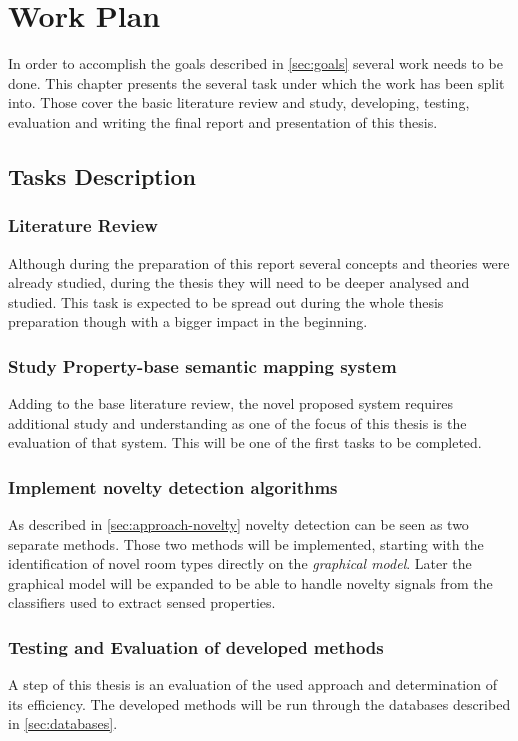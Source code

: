 \chapter{Work Plan}
\label{chap:workplan}
In order to accomplish the goals described in \autoref{sec:goals} several work needs to be done.
This chapter presents the several task under which the work has been split into.
Those cover the basic literature review and study, developing, testing, evaluation and writing the final report and presentation of this thesis.

\section{Tasks Description}
\subsection{Literature Review}
Although during the preparation of this report several concepts and theories were already studied, during the thesis they will need to be deeper analysed and studied.
This task is expected to be spread out during the whole thesis preparation though with a bigger impact in the beginning.

\subsection{Study Property-base semantic mapping system}
Adding to the base literature review, the novel proposed system \cite{pronobis2011exploiting} requires additional study and understanding as one of the focus of this thesis is the evaluation of that system. This will be one of the first tasks to be completed.

\subsection{Implement novelty detection algorithms}
As described in \autoref{sec:approach-novelty} novelty detection can be seen as two separate methods.
Those two methods will be implemented, starting with the identification of novel room types directly on the \emph{graphical model}.
Later the graphical model will be expanded to be able to handle novelty signals from the classifiers used to extract sensed properties.

\subsection{Testing and Evaluation of developed methods}
A step of this thesis is an evaluation of the used approach and determination of its efficiency.
The developed methods will be run through the databases described in \autoref{sec:databases}.

